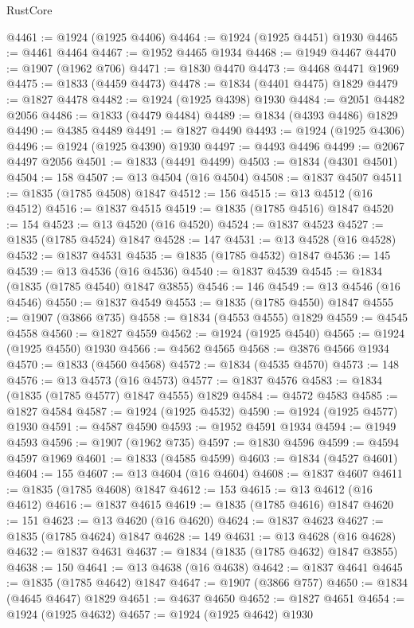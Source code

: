 \begin{lexlean}{RustCore}
\begin{coremodule}
@4461 := @1924 (@1925 @4406)
@4464 := @1924 (@1925 @4451) @1930
@4465 := @4461 @4464
@4467 := @1952 @4465 @1934
@4468 := @1949 @4467
@4470 := @1907 (@1962 @706)
@4471 := @1830 @4470
@4473 := @4468 @4471 @1969
@4475 := @1833 (@4459 @4473)
@4478 := @1834 (@4401 @4475) @1829
@4479 := @1827 @4478
@4482 := @1924 (@1925 @4398) @1930
@4484 := @2051 @4482 @2056
@4486 := @1833 (@4479 @4484)
@4489 := @1834 (@4393 @4486) @1829
@4490 := @4385 @4489
@4491 := @1827 @4490
@4493 := @1924 (@1925 @4306)
@4496 := @1924 (@1925 @4390) @1930
@4497 := @4493 @4496
@4499 := @2067 @4497 @2056
@4501 := @1833 (@4491 @4499)
@4503 := @1834 (@4301 @4501)
@4504 := 158
@4507 := @13 @4504 (@16 @4504)
@4508 := @1837 @4507
@4511 := @1835 (@1785 @4508) @1847
@4512 := 156
@4515 := @13 @4512 (@16 @4512)
@4516 := @1837 @4515
@4519 := @1835 (@1785 @4516) @1847
@4520 := 154
@4523 := @13 @4520 (@16 @4520)
@4524 := @1837 @4523
@4527 := @1835 (@1785 @4524) @1847
@4528 := 147
@4531 := @13 @4528 (@16 @4528)
@4532 := @1837 @4531
@4535 := @1835 (@1785 @4532) @1847
@4536 := 145
@4539 := @13 @4536 (@16 @4536)
@4540 := @1837 @4539
@4545 := @1834 (@1835 (@1785 @4540) @1847 @3855)
@4546 := 146
@4549 := @13 @4546 (@16 @4546)
@4550 := @1837 @4549
@4553 := @1835 (@1785 @4550) @1847
@4555 := @1907 (@3866 @735)
@4558 := @1834 (@4553 @4555) @1829
@4559 := @4545 @4558
@4560 := @1827 @4559
@4562 := @1924 (@1925 @4540)
@4565 := @1924 (@1925 @4550) @1930
@4566 := @4562 @4565
@4568 := @3876 @4566 @1934
@4570 := @1833 (@4560 @4568)
@4572 := @1834 (@4535 @4570)
@4573 := 148
@4576 := @13 @4573 (@16 @4573)
@4577 := @1837 @4576
@4583 := @1834 (@1835 (@1785 @4577) @1847 @4555) @1829
@4584 := @4572 @4583
@4585 := @1827 @4584
@4587 := @1924 (@1925 @4532)
@4590 := @1924 (@1925 @4577) @1930
@4591 := @4587 @4590
@4593 := @1952 @4591 @1934
@4594 := @1949 @4593
@4596 := @1907 (@1962 @735)
@4597 := @1830 @4596
@4599 := @4594 @4597 @1969
@4601 := @1833 (@4585 @4599)
@4603 := @1834 (@4527 @4601)
@4604 := 155
@4607 := @13 @4604 (@16 @4604)
@4608 := @1837 @4607
@4611 := @1835 (@1785 @4608) @1847
@4612 := 153
@4615 := @13 @4612 (@16 @4612)
@4616 := @1837 @4615
@4619 := @1835 (@1785 @4616) @1847
@4620 := 151
@4623 := @13 @4620 (@16 @4620)
@4624 := @1837 @4623
@4627 := @1835 (@1785 @4624) @1847
@4628 := 149
@4631 := @13 @4628 (@16 @4628)
@4632 := @1837 @4631
@4637 := @1834 (@1835 (@1785 @4632) @1847 @3855)
@4638 := 150
@4641 := @13 @4638 (@16 @4638)
@4642 := @1837 @4641
@4645 := @1835 (@1785 @4642) @1847
@4647 := @1907 (@3866 @757)
@4650 := @1834 (@4645 @4647) @1829
@4651 := @4637 @4650
@4652 := @1827 @4651
@4654 := @1924 (@1925 @4632)
@4657 := @1924 (@1925 @4642) @1930

\end{coremodule}
\end{lexlean}

